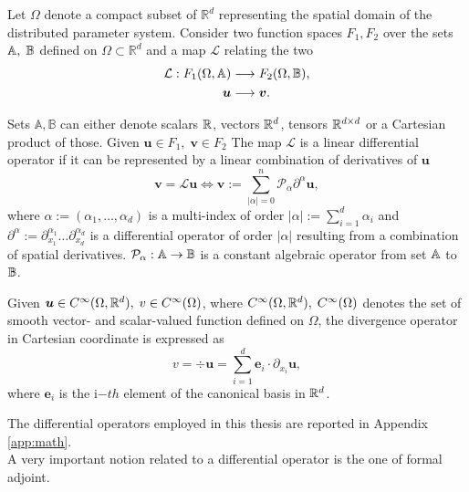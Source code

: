 Let $\Omega$ denote a compact subset of $\mathbb{R}^d$ representing the spatial domain of the distributed parameter system. Consider two function spaces $F_1, F_2$ over the sets $\mathbb{A}, \; \mathbb{B}$ defined on $\Omega \subset \mathbb{R}^d$ and a map $\mathcal{L}$ relating the two
\begin{equation}
	\begin{aligned}
	\mathcal{L}: F_1(\Omega, \mathbb{A}) &\longrightarrow F_2(\Omega, \mathbb{B}), \\
			     \bm{u} &\longrightarrow \bm{v}.
	\end{aligned}
\end{equation}

Sets $\mathbb{A}, \mathbb{B}$ can either denote  scalars $\mathbb{R}$, vectors $\mathbb{R}^d$,  tensors $\mathbb{R}^{d \times d}$ or a Cartesian product of those. Given $\bm{u} \in F_1, \;  \bm{v} \in F_2$ The map $\mathcal{L}$ is a linear differential operator if it can be represented by a linear combination of derivatives of $\bm{u}$
\begin{equation}
\bm{v} = \mathcal{L} \bm{u} \iff \bm{v} := \sum_{|\alpha|=0}^n  \mathcal{P}_{\alpha} \partial^{\alpha} \bm{u},
\end{equation}
where $\alpha := (\alpha_1, \dots , \alpha_d)$ is a multi-index of order $|\alpha| := \sum_{i=1}^d \alpha_i$ and $\partial^{\alpha} := \partial_{x_1}^{\alpha_1} \dots \partial_{x_d}^{\alpha_d}$ is a differential operator of order $|\alpha|$ resulting from a combination of spatial derivatives. $\mathcal{P}_\alpha: \mathbb{A} \rightarrow \mathbb{B}$ is a constant algebraic operator from set $\mathbb{A}$ to $\mathbb{B}$. 

\begin{example}
	Given $\bm{u} \in C^\infty(\Omega, \mathbb{R}^d), \; v \in C^\infty(\Omega)$, where $C^\infty(\Omega, \mathbb{R}^d), \; C^\infty(\Omega)$ denotes the set of smooth vector- and scalar-valued function defined on $\Omega$, the divergence operator in Cartesian coordinate is expressed as
	\begin{equation}
	v = \div \bm{u} = \sum_{i = 1}^d \bm{e}_i \cdot \partial_{x_i} \bm{u},
	\end{equation}
	where $\bm{e}_i$ is the i$-th$ element of the canonical basis in $\mathbb{R}^d$. 
\end{example}

The differential operators employed in this thesis are reported in Appendix \ref{app:math}. \\
A very important notion related to a differential operator is the one of formal adjoint. 

